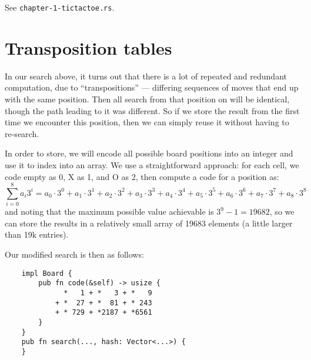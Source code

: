 \documentclass[10pt,dvipdfmx,letterpaper]{report}
\begin{document}
See {\tt chapter-1-tictactoe.rs}.


\section{Transposition tables}

In our search above, it turns out that there is a lot of repeated and
redundant computation, due to ``transpositions'' --- differing sequences of 
moves that end up with the same position.  Then all search from that position
on will be identical, though the path leading to it was different.  So if we
store the result from the first time we encounter this position, then we can
simply reuse it without having to re-search.

In order to store, we will encode all possible board positions into an
integer and use it to index into an array.  We use a straightforward
approach: for each cell, we code empty as 0, X as 1, and O as 2, then
compute a code for a position as:
\[
    \sum_{i=0}^8 a_i 3^i
    = a_0\cdot 3^0 + a_1\cdot 3^1 + a_2\cdot 3^2 +
      a_3\cdot 3^3 + a_4\cdot 3^4 + a_5\cdot 3^5 +
      a_6\cdot 3^6 + a_7\cdot 3^7 + a_8\cdot 3^8
\]
and noting that the maximum possible value achievable is
$3^9-1 = 19682$, so we can store the results in a relatively small array
of 19683 elements (a little larger than 19k entries).

Our modified search is then as follows:
{\scriptsize
\begin{verbatim}
    impl Board {
        pub fn code(&self) -> usize {
              *   1 + *   3 + *   9
            + *  27 + *  81 + * 243
            + * 729 + *2187 + *6561
        }
    }
    pub fn search(..., hash: Vector<...>) {
    }
\end{verbatim}
}


%
%
%
\end{document}
